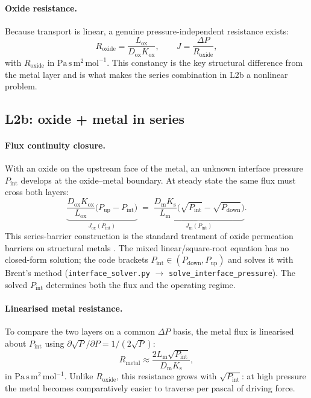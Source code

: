 \documentclass[11pt,a4paper]{article}
\newcommand{\Pup}{P_{\mathrm{up}}}
\newcommand{\Pdown}{P_{\mathrm{down}}}
\newcommand{\Pint}{P_{\mathrm{int}}}
\newcommand{\Ks}{K_{\mathrm{s}}}
\newcommand{\Kox}{K_{\mathrm{ox}}}
\newcommand{\Dm}{D_{\mathrm{m}}}
\newcommand{\Dox}{D_{\mathrm{ox}}}
\newcommand{\Lm}{L_{\mathrm{m}}}
\newcommand{\Lox}{L_{\mathrm{ox}}}
\newcommand{\Rox}{R_{\mathrm{oxide}}}
\newcommand{\Rmet}{R_{\mathrm{metal}}}
\newcommand{\code}[1]{\texttt{#1}}
\begin{document}
\paragraph{Oxide resistance.} Because transport is linear, a genuine
pressure-independent resistance exists:
\begin{equation}
  \Rox = \frac{\Lox}{\Dox \Kox},
  \qquad J = \frac{\Delta P}{\Rox},
  \label{eq:Rox}
\end{equation}
with $\Rox$ in $\mathrm{Pa\,s\,m^{2}\,mol^{-1}}$. This constancy is the key
structural difference from the metal layer and is what makes the series
combination in L2b a nonlinear problem.

\subsection{L2b: oxide + metal in series}

\paragraph{Flux continuity closure.} With an oxide on the upstream face of the
metal, an unknown interface pressure $\Pint$ develops at the oxide--metal
boundary. At steady state the same flux must cross both layers:
\begin{equation}
  \underbrace{\frac{\Dox\Kox}{\Lox}\bigl(\Pup - \Pint\bigr)}_{J_{\mathrm{ox}}(\Pint)}
  \;=\;
  \underbrace{\frac{\Dm\Ks}{\Lm}\bigl(\sqrt{\Pint} - \sqrt{\Pdown}\bigr)}_{J_{\mathrm{m}}(\Pint)} .
  \label{eq:closureL2b}
\end{equation}
This series-barrier construction is the standard treatment of oxide permeation
barriers on structural metals \citep{strehlow1974,hollenberg1995}. The mixed
linear/square-root equation has no closed-form solution; the code
brackets $\Pint \in (\Pdown, \Pup)$ and solves it with Brent's method
(\code{interface\_solver.py} $\rightarrow$ \code{solve\_interface\_pressure}).
The solved $\Pint$ determines both the flux and the operating regime.

\paragraph{Linearised metal resistance.} To compare the two layers on a common
$\Delta P$ basis, the metal flux is linearised about $\Pint$ using
$\partial\sqrt{P}/\partial P = 1/(2\sqrt{P})$:
\begin{equation}
  \Rmet \approx \frac{2 \Lm \sqrt{\Pint}}{\Dm \Ks},
  \label{eq:Rmetal}
\end{equation}
in $\mathrm{Pa\,s\,m^{2}\,mol^{-1}}$. Unlike $\Rox$, this resistance grows
with $\sqrt{\Pint}$: at high pressure the metal becomes comparatively easier
to traverse per pascal of driving force.
\end{document}
